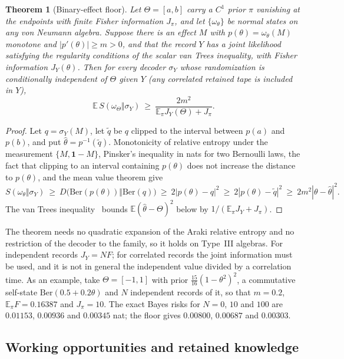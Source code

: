 \documentclass[12pt]{article}
\newtheorem{theorem}{Theorem}[section]
\theoremstyle{definition}
\theoremstyle{remark}
\newcommand{\E}{\mathbb E}
\begin{document}
\begin{theorem}[Binary-effect floor]\label{thm:vanTrees}
Let $\Theta=[a,b]$ carry a $C^1$ prior $\pi$ vanishing at the endpoints with finite Fisher information $J_\pi$, and let $\{\omega_\theta\}$ be normal states on any von Neumann algebra. Suppose there is an effect $M$ with $p(\theta)=\omega_\theta(M)$ monotone and $|p'(\theta)|\ge m>0$, and that the record $Y$ has a joint likelihood satisfying the regularity conditions of the scalar van Trees inequality, with Fisher information $J_Y(\theta)$. Then for every decoder $\sigma_Y$ whose randomization is conditionally independent of $\Theta$ given $Y$ (any correlated retained tape is included in $Y$),
\begin{equation}\label{eq:vanTrees}
\E\,S(\omega_\Theta\Vert\sigma_Y)\ \ge\ \frac{2m^2}{\E_\pi J_Y(\Theta)+J_\pi}.
\end{equation}
\end{theorem}

\begin{proof}
Let $q=\sigma_Y(M)$, let $\tilde q$ be $q$ clipped to the interval between $p(a)$ and $p(b)$, and put $\hat\theta=p^{-1}(\tilde q)$. Monotonicity of relative entropy under the measurement $\{M,\mathbf 1-M\}$, Pinsker's inequality in nats for two Bernoulli laws, the fact that clipping to an interval containing $p(\theta)$ does not increase the distance to $p(\theta)$, and the mean value theorem give
\[
S(\omega_\theta\Vert\sigma_Y)\ \ge\ D\bigl(\mathrm{Ber}(p(\theta))\Vert\mathrm{Ber}(q)\bigr)\ \ge\ 2|p(\theta)-q|^2\ \ge\ 2|p(\theta)-\tilde q|^2\ \ge\ 2m^2|\theta-\hat\theta|^2 .
\]
The van Trees inequality~\cite{vanTrees1968} bounds $\E(\hat\theta-\Theta)^2$ below by $1/(\E_\pi J_Y+J_\pi)$.
\end{proof}

The theorem needs no quadratic expansion of the Araki relative entropy and no restriction of the decoder to the family, so it holds on Type~III algebras. For independent records $J_Y=NF$; for correlated records the joint information must be used, and it is not in general the independent value divided by a correlation time. As an example, take $\Theta=[-1,1]$ with prior $\tfrac{15}{16}(1-\theta^2)^2$, a commutative self-state $\mathrm{Ber}(0.5+0.2\theta)$ and $N$ independent records of it, so that $m=0.2$, $\E_\pi F=0.16387$ and $J_\pi=10$. The exact Bayes risks for $N=0$, $10$ and $100$ are $0.01153$, $0.00936$ and $0.00345$ nat; the floor gives $0.00800$, $0.00687$ and $0.00303$.

\subsection{Working opportunities and retained knowledge}\label{sec:working}
\end{document}
